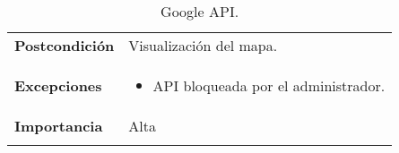 \begin{longtable}[H]{@{}l|l@{}}
\begin{minipage}[t]{0.71\columnwidth}
	\end{minipage}\tabularnewline
	\midrule
	\begin{minipage}[t]{0.23\columnwidth}\raggedright\strut
		\textbf{Postcondición}\strut
	\end{minipage} & \begin{minipage}[t]{0.71\columnwidth}\raggedright\strut
		Visualización del mapa.\strut
	\end{minipage}\tabularnewline
	\midrule
	\begin{minipage}[t]{0.23\columnwidth}\raggedright\strut
		\textbf{Excepciones}\strut
	\end{minipage} & \begin{minipage}[t]{0.71\columnwidth}\raggedright
		\begin{itemize}
			\tightlist
			\item API bloqueada por el administrador.
		\end{itemize}
	\end{minipage}\tabularnewline
	\midrule
	\begin{minipage}[t]{0.23\columnwidth}\raggedright\strut
		\textbf{Importancia}\strut
	\end{minipage} & \begin{minipage}[t]{0.71\columnwidth}\raggedright\strut
		Alta\strut
	\end{minipage}\tabularnewline
	\bottomrule
	\caption{Google API.}
	\label{cu:2.1.1}
\end{longtable}
\newpage

